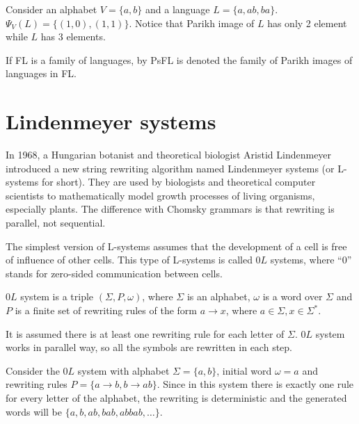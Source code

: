 \begin{example}
Consider an alphabet $V=\{a,b\}$ and a language $L=\{a, ab, ba\}$.
$\Psi_V(L)=\{(1,0), (1,1)\}$. Notice that Parikh image of $L$ has only 2 element while $L$ has 3 elements.
\end{example}

\begin{definition}
If FL is a family of languages, by PsFL is denoted the family of Parikh images of languages in FL.
\end{definition}



\section{Lindenmeyer systems} %
\label{sec:lindenmeyer_systems}

In 1968, a Hungarian botanist and theoretical biologist Aristid Lindenmeyer introduced \cite{Lindenmeyer68} a new string rewriting algorithm named Lindenmeyer systems (or L-systems for short). They are used by biologists and theoretical computer scientists to mathematically model growth processes of living organisms, especially plants. The difference with Chomsky grammars is that rewriting is parallel, not sequential.

The simplest version of L-systems assumes that the development of a cell is free of influence of other cells.
This type of L-systems is called $0L$ systems, where ``0'' stands for zero-sided communication between cells.

\begin{definition}
$0L$ system is a triple $(\Sigma, P, \omega)$, where $\Sigma$ is an alphabet, $\omega$ is a word over $\Sigma$ and $P$ is a finite set of rewriting rules of the form $a\rightarrow x$, where $a\in\Sigma, x\in\Sigma^*$.
\end{definition}

It is assumed there is at least one rewriting rule for each letter of $\Sigma$. $0L$ system works in parallel way, so all the symbols are rewritten in each step.

\begin{example}
Consider the $0L$ system with alphabet $\Sigma = \{a,b\}$, initial word $\omega = a$ and rewriting rules $P = \{a\rightarrow b, b\rightarrow ab\}$.
Since in this system there is exactly one rule for every letter of the alphabet, the rewriting is deterministic and the generated words will be $\{a, b, ab, bab, abbab, \dots \}$. 
\end{example}

